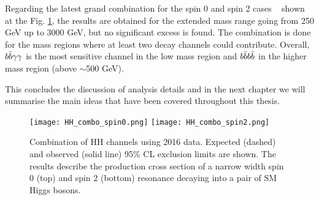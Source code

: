 Regarding the latest grand combination for the spin 0 and spin 2 cases ~\cite{CMS-PAS-HIG-17-030} shown at the Fig. \ref{HH_combo}, the results are obtained for the extended mass range going from 250 GeV up to 3000 GeV, but no significant excess is found. The combination is done for the mass regions where at least two decay channels could contribute. Overall, $b\bar{b} \gamma\gamma$ is the most sensitive channel in the low mass region and $b\bar{b} b\bar{b}$ in the higher mass region (above $\sim$500 GeV).

This concludes the discussion of analysis details and in the next chapter we will summarise the main ideas that have been covered throughout this thesis. 


\begin{figure}[H]%
  \begin{center}
    \texttt{[image: HH\_combo\_spin0.png]}
    \texttt{[image: HH\_combo\_spin2.png]}
    \caption{ Combination of HH channels using 2016 data. Expected (dashed) and observed (solid line) 95\% CL exclusion limits are shown. The results describe the production cross section of a narrow width spin 0 (top) and spin 2 (bottom) resonance decaying into a pair of SM Higgs bosons.  }
    \label{HH_combo}
  \end{center}
\end{figure}











